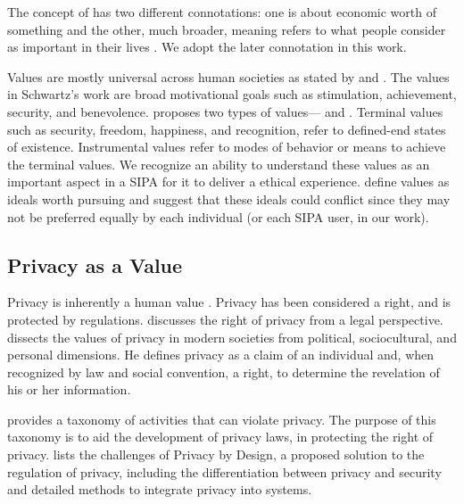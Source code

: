 The concept of  has two different connotations: one is about economic worth of something and the other, much broader, meaning refers to what people consider as important in their lives \citep{Friedman-2008-value-sensitive-design}. 
We adopt the later connotation in this work.

Values are mostly universal across human societies as stated by \citet{schwartz2012overview}
and \citet{rokeach1973nature}. The values in Schwartz's  work are broad motivational goals such as stimulation, achievement, security, and benevolence. \citet{rokeach1973nature} proposes two types of values--- and . Terminal values  such as security, freedom, happiness, and recognition, refer to defined-end states of existence. Instrumental values refer to modes of behavior or means to achieve the terminal values. 
%
We recognize an ability to understand these values as an important aspect in a SIPA for it to deliver a ethical experience.
\citet{Dechesne-AIL13-Norms+Values} define values as
ideals worth pursuing and suggest that these ideals could conflict since
they may not be preferred equally by each individual (or each SIPA user, in our work).


\subsection{Privacy as a Value}
Privacy is inherently a human value \citep{spiekermann2009enggprivacy,smith2007privacy}. 
Privacy has been considered a right, and is protected by regulations. \citet{Prosser-60:Privacy} discusses the right of privacy from a legal perspective. \citet{westin2003social} dissects the values of privacy in modern societies from political, sociocultural, and personal dimensions. He defines privacy as a claim of an individual and, when recognized by law and social convention, a right, to determine the revelation of his or her information.

\citet{solove-2006-taxonomy} provides a taxonomy of activities that can violate privacy. The purpose of this taxonomy is to aid the development of privacy laws, in protecting the right of privacy.
\citet{Spiekermann-2012-Challenges+PrivacyDesign} lists the challenges of Privacy by Design, a proposed solution to the regulation of privacy, including the differentiation between privacy and security and detailed methods to integrate privacy into systems. 

